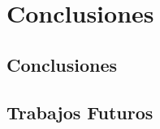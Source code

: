 \chapter{Conclusiones}

\label{Chapter5}

\section{Conclusiones}

\lipsum[1]

\section{Trabajos Futuros}

\lipsum[1]